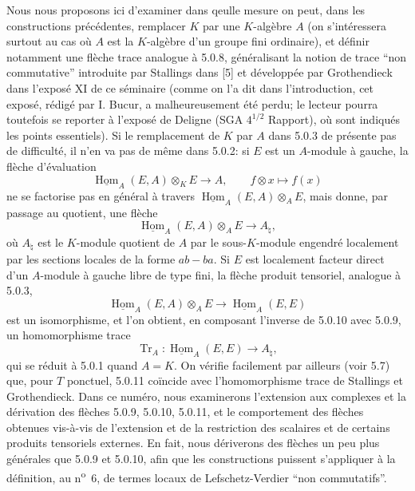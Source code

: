 \documentclass[11pt]{article}
\DeclareMathOperator{\Hom}{Hom}
\providecommand{\uHom}{\underline{\Hom}}
\providecommand{\Tr}{\operatorname{Tr}}
\providecommand{\Tr}{\operatorname{Tr}}
\providecommand{\Tr}{\operatorname{Tr}}
\providecommand{\Hom}{\operatorname{Hom}}
\providecommand{\Tr}{\operatorname{Tr}}
\providecommand{\Hom}{\operatorname{Hom}}
\providecommand{\Tr}{\operatorname{Tr}}
\begin{document}
Nous nous proposons ici d'examiner dans qeulle mesure on peut, dans les constructions précédentes, remplacer $K$ par une $K$-algèbre $A$ (on s'intéressera surtout au cas où $A$ est la $K$-algèbre d'un groupe fini ordinaire), et définir notamment une flèche trace analogue à 5.0.8, généralisant la notion de trace ``non commutative'' introduite par Stallings dans [5] et développée par Grothendieck dans l'exposé XI de ce séminaire (comme on l'a dit dans l'introduction, cet exposé, rédigé par I. Bucur, a malheureusement été perdu; le lecteur pourra toutefois se reporter à l'exposé de Deligne (SGA $4^{1/2}$ Rapport), où sont indiqués les points essentiels). Si le remplacement de $K$ par $A$ dans 5.0.3 de présente pas de difficulté, il n'en va pas de même dans 5.0.2: si $E$ est un $A$-module à gauche, la flèche d'évaluation
\[
\uHom_A(E,A)\otimes_KE\longrightarrow A,
\qquad f\otimes x\longmapsto f(x)
\]
ne se factorise pas en général à travers $\uHom_A(E,A)\otimes_AE$, mais donne, par passage au quotient, une flèche
\begin{equation}\tag{5.0.9}
\uHom_A(E,A)\otimes_AE\longrightarrow A_\natural,
\end{equation}
où $A_\natural$ est le $K$-module quotient de $A$ par le sous-$K$-module engendré localement par les sections locales de la forme $ab-ba$. Si $E$ est localement facteur direct d'un $A$-module à gauche libre de type fini, la flèche produit tensoriel, analogue à 5.0.3,
\begin{equation}\tag{5.0.10}
\uHom_A(E,A)\otimes_AE\longrightarrow\uHom_A(E,E)
\end{equation}
est un isomorphisme, et l'on obtient, en composant l'inverse de 5.0.10 avec 5.0.9, un homomorphisme trace
\begin{equation}\tag{5.0.11}
\Tr_A:\uHom_A(E,E)\longrightarrow A_\natural,
\end{equation}
qui se réduit à 5.0.1 quand $A=K$. On vérifie facilement par ailleurs (voir 5.7) que, pour $T$ ponctuel, 5.0.11 coïncide avec l'homomorphisme trace de Stallings et Grothendieck. Dans ce numéro, nous examinerons l'extension aux complexes et la dérivation des flèches 5.0.9, 5.0.10, 5.0.11, et le comportement des flèches obtenues vis-à-vis de l'extension et de la restriction des scalaires et de certains produits tensoriels externes. En fait, nous dériverons des flèches un peu plus générales que 5.0.9 et 5.0.10, afin que les constructions puissent s'appliquer à la définition, au n\textsuperscript{o}~6, de termes locaux de Lefschetz-Verdier ``non commutatifs''.
\end{document}
